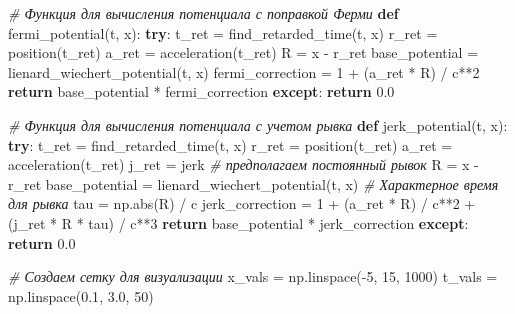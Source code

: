 \documentclass[11pt]{article}
\newenvironment{Shaded}{}{}
\newcommand{\KeywordTok}[1]{\textcolor[rgb]{0.00,0.44,0.13}{\textbf{{#1}}}}
\newcommand{\DecValTok}[1]{\textcolor[rgb]{0.25,0.63,0.44}{{#1}}}
\newcommand{\FloatTok}[1]{\textcolor[rgb]{0.25,0.63,0.44}{{#1}}}
\newcommand{\CommentTok}[1]{\textcolor[rgb]{0.38,0.63,0.69}{\textit{{#1}}}}
\newcommand{\NormalTok}[1]{{#1}}
\newcommand{\ControlFlowTok}[1]{\textcolor[rgb]{0.00,0.44,0.13}{\textbf{{#1}}}}
\newcommand{\OperatorTok}[1]{\textcolor[rgb]{0.40,0.40,0.40}{{#1}}}
\newcommand{\BuiltInTok}[1]{{#1}}
\begin{document}
\begin{Shaded}
\begin{Highlighting}[]
\CommentTok{# Функция для вычисления потенциала с поправкой Ферми}
\KeywordTok{def}\NormalTok{ fermi_potential(t, x):}
    \ControlFlowTok{try}\NormalTok{:}
\NormalTok{        t_ret }\OperatorTok{=}\NormalTok{ find_retarded_time(t, x)}
\NormalTok{        r_ret }\OperatorTok{=}\NormalTok{ position(t_ret)}
\NormalTok{        a_ret }\OperatorTok{=}\NormalTok{ acceleration(t_ret)}
\NormalTok{        R }\OperatorTok{=}\NormalTok{ x }\OperatorTok{-}\NormalTok{ r_ret}
\NormalTok{        base_potential }\OperatorTok{=}\NormalTok{ lienard_wiechert_potential(t, x)}
\NormalTok{        fermi_correction }\OperatorTok{=} \DecValTok{1} \OperatorTok{+}\NormalTok{ (a_ret }\OperatorTok{*}\NormalTok{ R) }\OperatorTok{/}\NormalTok{ c}\OperatorTok{**}\DecValTok{2}
        \ControlFlowTok{return}\NormalTok{ base_potential }\OperatorTok{*}\NormalTok{ fermi_correction}
    \ControlFlowTok{except}\NormalTok{:}
        \ControlFlowTok{return} \FloatTok{0.0}

\CommentTok{# Функция для вычисления потенциала с учетом рывка}
\KeywordTok{def}\NormalTok{ jerk_potential(t, x):}
    \ControlFlowTok{try}\NormalTok{:}
\NormalTok{        t_ret }\OperatorTok{=}\NormalTok{ find_retarded_time(t, x)}
\NormalTok{        r_ret }\OperatorTok{=}\NormalTok{ position(t_ret)}
\NormalTok{        a_ret }\OperatorTok{=}\NormalTok{ acceleration(t_ret)}
\NormalTok{        j_ret }\OperatorTok{=}\NormalTok{ jerk  }\CommentTok{# предполагаем постоянный рывок}
\NormalTok{        R }\OperatorTok{=}\NormalTok{ x }\OperatorTok{-}\NormalTok{ r_ret}
\NormalTok{        base_potential }\OperatorTok{=}\NormalTok{ lienard_wiechert_potential(t, x)}
        \CommentTok{# Характерное время для рывка}
\NormalTok{        tau }\OperatorTok{=}\NormalTok{ np.}\BuiltInTok{abs}\NormalTok{(R) }\OperatorTok{/}\NormalTok{ c}
\NormalTok{        jerk_correction }\OperatorTok{=} \DecValTok{1} \OperatorTok{+}\NormalTok{ (a_ret }\OperatorTok{*}\NormalTok{ R) }\OperatorTok{/}\NormalTok{ c}\OperatorTok{**}\DecValTok{2} \OperatorTok{+}\NormalTok{ (j_ret }\OperatorTok{*}\NormalTok{ R }\OperatorTok{*}\NormalTok{ tau) }\OperatorTok{/}\NormalTok{ c}\OperatorTok{**}\DecValTok{3}
        \ControlFlowTok{return}\NormalTok{ base_potential }\OperatorTok{*}\NormalTok{ jerk_correction}
    \ControlFlowTok{except}\NormalTok{:}
        \ControlFlowTok{return} \FloatTok{0.0}

\CommentTok{# Создаем сетку для визуализации}
\NormalTok{x_vals }\OperatorTok{=}\NormalTok{ np.linspace(}\OperatorTok{-}\DecValTok{5}\NormalTok{, }\DecValTok{15}\NormalTok{, }\DecValTok{1000}\NormalTok{)}
\NormalTok{t_vals }\OperatorTok{=}\NormalTok{ np.linspace(}\FloatTok{0.1}\NormalTok{, }\FloatTok{3.0}\NormalTok{, }\DecValTok{50}\NormalTok{)}


\end{Highlighting}
\end{Shaded}
\end{document}
